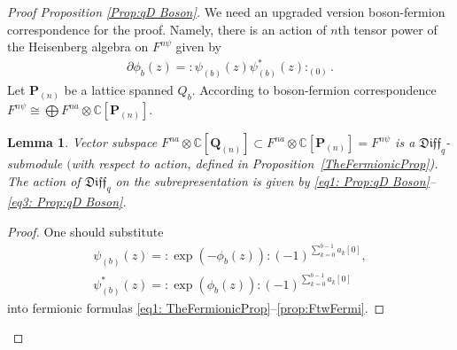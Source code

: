 \documentclass[pdftex]{sigma}
\numberwithin{equation}{section}
\newtheorem{Lemma}[Theorem]{Lemma}
\theoremstyle{definition}
\newcommand{\qD}{\mathfrak{Diff}_q}
\newcommand{\psib}{\psi^*_{( b )}}
\newcommand{\psibb}{\psi_{( b )}}
\newcommand{\phib}{\phi_{b}}
\newcommand{\Q}{\mathbf{Q}_{(n)}}
\renewcommand{\P}{\mathbf{P}_{(n)}}
\begin{document}
\begin{proof}[Proof Proposition \ref{Prop:qD Boson}]
We need an upgraded version boson-fermion correspondence for the proof.
Namely, there is an action of $n$th tensor power of the Heisenberg algebra on $F^{n \psi}$ given by
\begin{gather*}
\partial \phib(z) = : \! \psibb (z) \psib (z) \! :_{(0)}.
\end{gather*}
Let $\P$ be a lattice spanned $Q_b$. According to boson-fermion correspondence $F^{n \psi} \cong \bigoplus F^{na} \otimes \mathbb{C} [ \P ]$.

\begin{Lemma} \label{lemma: subst boson fermi}
Vector subspace $F^{na} \otimes \mathbb{C} [ \Q ] \subset F^{na} \otimes \mathbb{C} [ \P ] = F^{n \psi}$ is a $\qD$-submodule $($with respect to action, defined in Proposition~{\rm \ref{TheFermionicProp})}. The action of $\qD$ on the subrepresentation is given by \eqref{eq1: Prop:qD Boson}--\eqref{eq3: Prop:qD Boson}.
\end{Lemma}
\begin{proof}
One should substitute
\begin{gather}
\psibb (z) = : \! \exp \left( -\phib (z) \right) \! : (-1)^{\sum\limits_{k=0}^{b-1} a_k[0] }, \label{eq:boson psi}\\
\psib (z) = : \! \exp \left( \phib (z) \right) \! : (-1)^{\sum\limits_{k=0}^{b-1} a_k[0] } \label{eq:boson psi*}
\end{gather}
into fermionic formulas \eqref{eq1: TheFermionicProp}--\eqref{prop:FtwFermi}.
\end{proof}


\end{proof}
\end{document}
